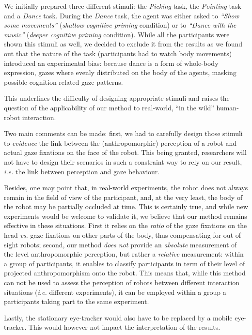 \documentclass[lettersize, noapacite, twoside, HRI]{apa_HRI}
\newcommand{\ie}{\textit{i.e.}\xspace}
\newcommand{\vs}{\textit{vs.}\xspace}
\begin{document}
We initially prepared three different stimuli: the \emph{Picking} task, the
\emph{Pointing} task and a \emph{Dance} task.  During the \emph{Dance} task, the
agent was either asked to \emph{``Show some movements''} (\emph{shallow
cognitive priming} condition) or to \emph{``Dance with the music''}
(\emph{deeper cognitive priming} condition). While all the participants were
shown this stimuli as well, we decided to exclude it from the results as we
found out that the nature of the task (participants had to watch body movements)
introduced an experimental bias: because dance is a form of whole-body
expression, gazes where evenly distributed on the body of the agents, masking
possible cognition-related gaze patterns.

This underlines the difficulty of designing appropriate stimuli and raises the
question of the applicability of our method to real-world, ``in the wild''
human-robot interaction.

Two main comments can be made: first, we had to carefully design those stimuli
to \emph{evidence} the link between the (anthropomorphic) perception of a robot
and actual gaze fixations on the face of the robot. This being granted,
researchers will not have to design their scenarios in such a constraint way to
rely on our result, \ie the link between perception and gaze behaviour.

Besides, one may point that, in real-world experiments, the robot does not
always remain in the field of view of the participant, and, at the very least, the
body of the robot may be partially occluded at time.  This is certainly true,
and while new experiments would be welcome to validate it, we believe that our
method remains effective in these situations. First it relies on the
\emph{ratio} of the gaze fixations on the head \vs gaze fixations on other parts
of the body, thus compensating for out-of-sight robots; second, our method
\emph{does not} provide an \emph{absolute} measurement of the level
anthropomorphic perception, but rather a \emph{relative} measurement: within a
group of participants, it enables to classify participants in term of their level of
projected anthropomorphism onto the robot.  This means that, while this method
can not be used to assess the perception of robots between different interaction
situations (\ie different experiments), it can be employed within a group a
participants taking part to the same experiment.

Lastly, the stationary eye-tracker would also have to be replaced by a mobile
eye-tracker. This would however not impact the interpretation of the results.
\end{document}
